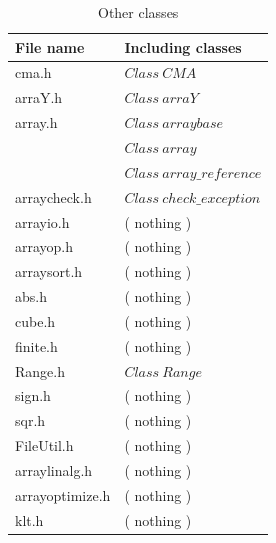 \documentclass[twocolumn]{article}
\begin{document}
\begin{table}[h]
\begin{center}
\caption{Other classes}
\label{AppB}
{\scriptsize
\begin{tabular}{|l|l|}\hline
File name \hspace{10mm}      & Including classes \hspace{15mm}       \\\hline\hline 
cma.h                        & $Class \ CMA                        $ \\\hline
arraY.h                      & $Class \ arraY                      $ \\\hline
array.h                      & $Class \ arraybase                  $ \\
                             & $Class \ array                      $ \\
                             & $Class \ array\_reference           $ \\\hline
arraycheck.h                 & $Class \ check\_exception           $ \\\hline
arrayio.h                    & ( nothing )                           \\\hline
arrayop.h                    & ( nothing )                           \\\hline
arraysort.h                  & ( nothing )                           \\\hline
abs.h                        & ( nothing )                           \\\hline
cube.h                       & ( nothing )                           \\\hline
finite.h                     & ( nothing )                           \\\hline
Range.h                      & $Class \ Range                      $ \\\hline
sign.h                       & ( nothing )                           \\\hline
sqr.h                        & ( nothing )                           \\\hline
FileUtil.h                   & ( nothing )                           \\\hline
arraylinalg.h                & ( nothing )                           \\\hline
arrayoptimize.h              & ( nothing )                           \\\hline
klt.h                        & ( nothing )                           \\\hline

\end{tabular}}
\end{center}
\end{table}
\end{document}
